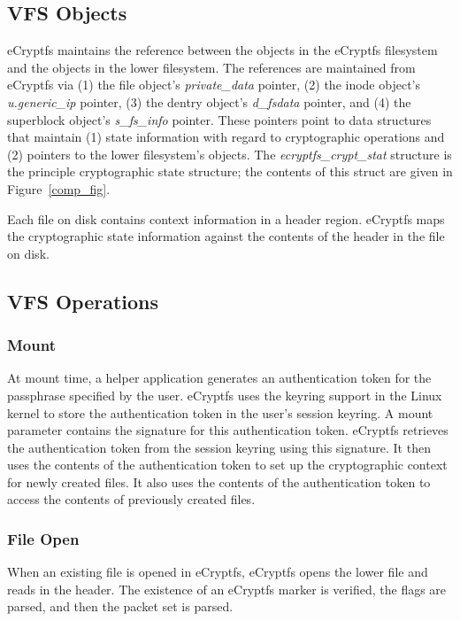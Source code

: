 \documentclass{article}
\begin{document}
\subsection{VFS Objects}

eCryptfs maintains the reference between the objects in the eCryptfs
filesystem and the objects in the lower filesystem. The references are
maintained from eCryptfs via (1) the file object's \emph{private\_data}
pointer, (2) the inode object's \emph{u.generic\_ip} pointer, (3) the
dentry object's \emph{d\_fsdata} pointer, and (4) the superblock
object's \emph{s\_fs\_info} pointer. These pointers point to data
structures that maintain (1) state information with regard to
cryptographic operations and (2) pointers to the lower filesystem's
objects. The \emph{ecryptfs\_crypt\_stat} structure is the principle
cryptographic state structure; the contents of this struct are given in
Figure~\ref{comp_fig}.

Each file on disk contains context information in a header
region. eCryptfs maps the cryptographic state information against the
contents of the header in the file on disk.

\subsection{VFS Operations}

\subsubsection{Mount}

At mount time, a helper application generates an authentication token
for the passphrase specified by the user. eCryptfs uses the keyring
support in the Linux kernel to store the authentication token in the
user's session keyring. A mount parameter contains the signature for
this authentication token. eCryptfs retrieves the authentication token
from the session keyring using this signature. It then uses the
contents of the authentication token to set up the cryptographic
context for newly created files. It also uses the contents of the
authentication token to access the contents of previously created
files.

\subsubsection{File Open}

When an existing file is opened
in eCryptfs, eCryptfs opens the lower file and reads in the header. 
The existence of an eCryptfs marker is verified, 
the flags are parsed, 
and then the packet set is parsed.
\end{document}
